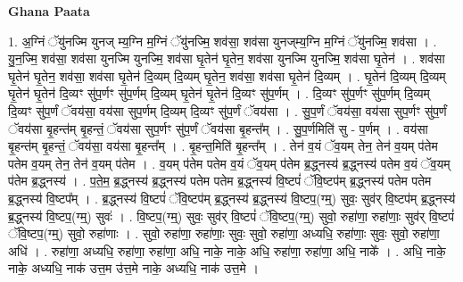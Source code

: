 \documentclass[17pt]{extarticle}
\begin{document}
\textbf{Ghana Paata } \newline

1. अ॒ग्निं ॅयु॑नज्मि युनज् म्य॒ग्नि म॒ग्निं ॅयु॑नज्मि॒ शव॑सा॒ शव॑सा युनज्‌म्य॒ग्नि म॒ग्निं ॅयु॑नज्मि॒ शव॑सा । . यु॒न॒ज्मि॒ शव॑सा॒ शव॑सा युनज्मि युनज्मि॒ शव॑सा घृ॒तेन॑ घृ॒तेन॒ शव॑सा युनज्मि युनज्मि॒ शव॑सा घृ॒तेन॑ । . शव॑सा घृ॒तेन॑ घृ॒तेन॒ शव॑सा॒ शव॑सा घृ॒तेन॑ दि॒व्यम् दि॒व्यम् घृ॒तेन॒ शव॑सा॒ शव॑सा घृ॒तेन॑ दि॒व्यम् । . घृ॒तेन॑ दि॒व्यम् दि॒व्यम् घृ॒तेन॑ घृ॒तेन॑ दि॒व्यꣳ सु॑प॒र्णꣳ सु॑प॒र्णम् दि॒व्यम् घृ॒तेन॑ घृ॒तेन॑ दि॒व्यꣳ सु॑प॒र्णम् । . दि॒व्यꣳ सु॑प॒र्णꣳ सु॑प॒र्णम् दि॒व्यम् दि॒व्यꣳ सु॑प॒र्णं ॅवय॑सा॒ वय॑सा सुप॒र्णम् दि॒व्यम् दि॒व्यꣳ सु॑प॒र्णं ॅवय॑सा । . सु॒प॒र्णं ॅवय॑सा॒ वय॑सा सुप॒र्णꣳ सु॑प॒र्णं ॅवय॑सा बृ॒हन्त॑म् बृ॒हन्तं॒ ॅवय॑सा सुप॒र्णꣳ सु॑प॒र्णं ॅवय॑सा बृ॒हन्त᳚म् । . सु॒प॒र्णमिति॑ सु - प॒र्णम् । . वय॑सा बृ॒हन्त॑म् बृ॒हन्तं॒ ॅवय॑सा॒ वय॑सा बृ॒हन्त᳚म् । . बृ॒हन्त॒मिति॑ बृ॒हन्त᳚म् । . तेन॑ व॒यं ॅव॒यम् तेन॒ तेन॑ व॒यम् प॑तेम पतेम व॒यम् तेन॒ तेन॑ व॒यम् प॑तेम । . व॒यम् प॑तेम पतेम व॒यं ॅव॒यम् प॑तेम ब्र॒द्ध्नस्य॑ ब्र॒द्ध्नस्य॑ पतेम व॒यं ॅव॒यम् प॑तेम ब्र॒द्ध्नस्य॑ । . प॒ते॒म॒ ब्र॒द्ध्नस्य॑ ब्र॒द्ध्नस्य॑ पतेम पतेम ब्र॒द्ध्नस्य॑ वि॒ष्टपं॑ ॅवि॒ष्टप॑म् ब्र॒द्ध्नस्य॑ पतेम पतेम ब्र॒द्ध्नस्य॑ वि॒ष्टप᳚म् । . ब्र॒द्ध्नस्य॑ वि॒ष्टपं॑ ॅवि॒ष्टप॑म् ब्र॒द्ध्नस्य॑ ब्र॒द्ध्नस्य॑ वि॒ष्टप॒(ग्म्॒) सुवः॒ सुव॑र् वि॒ष्टप॑म् ब्र॒द्ध्नस्य॑ ब्र॒द्ध्नस्य॑ वि॒ष्टप॒(ग्म्॒) सुवः॑ । . वि॒ष्टप॒(ग्म्॒) सुवः॒ सुव॑र् वि॒ष्टपं॑ ॅवि॒ष्टप॒(ग्म्॒) सुवो॒ रुहा॑णा॒ रुहा॑णाः॒ सुव॑र् वि॒ष्टपं॑ ॅवि॒ष्टप॒(ग्म्॒) सुवो॒ रुहा॑णाः । . सुवो॒ रुहा॑णा॒ रुहा॑णाः॒ सुवः॒ सुवो॒ रुहा॑णा॒ अध्यधि॒ रुहा॑णाः॒ सुवः॒ सुवो॒ रुहा॑णा॒ अधि॑ । . रुहा॑णा॒ अध्यधि॒ रुहा॑णा॒ रुहा॑णा॒ अधि॒ नाके॒ नाके॒ अधि॒ रुहा॑णा॒ रुहा॑णा॒ अधि॒ नाके᳚ । . अधि॒ नाके॒ नाके॒ अध्यधि॒ नाक॑ उत्त॒म उ॑त्त॒मे नाके॒ अध्यधि॒ नाक॑ उत्त॒मे । \newline
\end{document}
